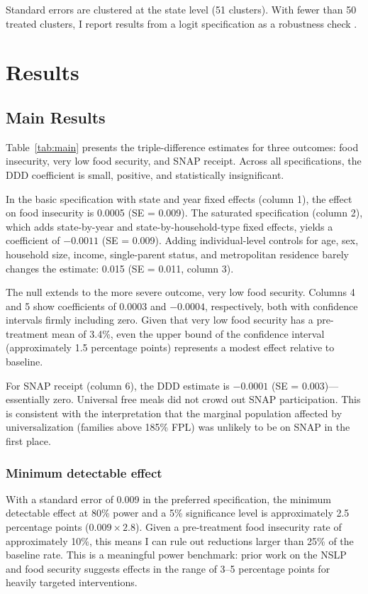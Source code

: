 \documentclass[12pt]{article}
\begin{document}
Standard errors are clustered at the state level (51 clusters). With fewer than 50 treated clusters, I report results from a logit specification as a robustness check \citep{bertrand2004emily}.


\section{Results}
\label{sec:results}

\subsection{Main Results}

Table~\ref{tab:main} presents the triple-difference estimates for three outcomes: food insecurity, very low food security, and SNAP receipt. Across all specifications, the DDD coefficient is small, positive, and statistically insignificant.

In the basic specification with state and year fixed effects (column 1), the effect on food insecurity is 0.0005 (SE = 0.009). The saturated specification (column 2), which adds state-by-year and state-by-household-type fixed effects, yields a coefficient of $-0.0011$ (SE = 0.009). Adding individual-level controls for age, sex, household size, income, single-parent status, and metropolitan residence barely changes the estimate: 0.015 (SE = 0.011, column 3).

The null extends to the more severe outcome, very low food security. Columns 4 and 5 show coefficients of 0.0003 and $-0.0004$, respectively, both with confidence intervals firmly including zero. Given that very low food security has a pre-treatment mean of 3.4\%, even the upper bound of the confidence interval (approximately 1.5 percentage points) represents a modest effect relative to baseline.

For SNAP receipt (column 6), the DDD estimate is $-0.0001$ (SE = 0.003)---essentially zero. Universal free meals did not crowd out SNAP participation. This is consistent with the interpretation that the marginal population affected by universalization (families above 185\% FPL) was unlikely to be on SNAP in the first place.



\subsubsection*{Minimum detectable effect} With a standard error of 0.009 in the preferred specification, the minimum detectable effect at 80\% power and a 5\% significance level is approximately 2.5 percentage points ($0.009 \times 2.8$). Given a pre-treatment food insecurity rate of approximately 10\%, this means I can rule out reductions larger than 25\% of the baseline rate. This is a meaningful power benchmark: prior work on the NSLP and food security \citep{smith2017effect} suggests effects in the range of 3--5 percentage points for heavily targeted interventions.
\end{document}
